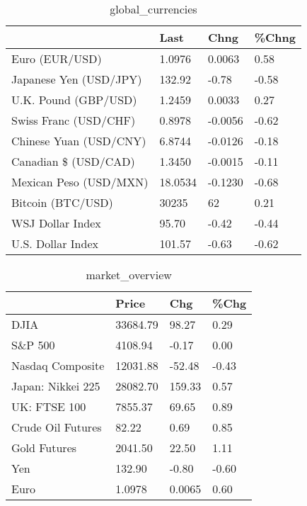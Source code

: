 \documentclass{article}%
\begin{document}
%


\begin{table}[htbp]%
\caption{global\_currencies}%
\centering%
\begin{adjustbox}{width=1\textwidth}%
\begin{tabular}{llll}
\toprule
                       &    Last &    Chng & \%Chng \\
\midrule
        Euro (EUR/USD) &  1.0976 &  0.0063 &  0.58 \\
Japanese Yen (USD/JPY) &  132.92 &   -0.78 & -0.58 \\
  U.K. Pound (GBP/USD) &  1.2459 &  0.0033 &  0.27 \\
 Swiss Franc (USD/CHF) &  0.8978 & -0.0056 & -0.62 \\
Chinese Yuan (USD/CNY) &  6.8744 & -0.0126 & -0.18 \\
  Canadian \$ (USD/CAD) &  1.3450 & -0.0015 & -0.11 \\
Mexican Peso (USD/MXN) & 18.0534 & -0.1230 & -0.68 \\
     Bitcoin (BTC/USD) &   30235 &      62 &  0.21 \\
      WSJ Dollar Index &   95.70 &   -0.42 & -0.44 \\
     U.S. Dollar Index &  101.57 &   -0.63 & -0.62 \\
\bottomrule
\end{tabular}
%
\end{adjustbox}%
\end{table}

%


\begin{table}[htbp]%
\caption{market\_overview}%
\centering%
\begin{adjustbox}{width=1\textwidth}%
\begin{tabular}{llll}
\toprule
                  &    Price &    Chg &  \%Chg \\
\midrule
             DJIA & 33684.79 &  98.27 &  0.29 \\
          S\&P 500 &  4108.94 &  -0.17 &  0.00 \\
 Nasdaq Composite & 12031.88 & -52.48 & -0.43 \\
Japan: Nikkei 225 & 28082.70 & 159.33 &  0.57 \\
     UK: FTSE 100 &  7855.37 &  69.65 &  0.89 \\
Crude Oil Futures &    82.22 &   0.69 &  0.85 \\
     Gold Futures &  2041.50 &  22.50 &  1.11 \\
              Yen &   132.90 &  -0.80 & -0.60 \\
             Euro &   1.0978 & 0.0065 &  0.60 \\
\bottomrule
\end{tabular}
%
\end{adjustbox}%
\end{table}

%
\end{document}
